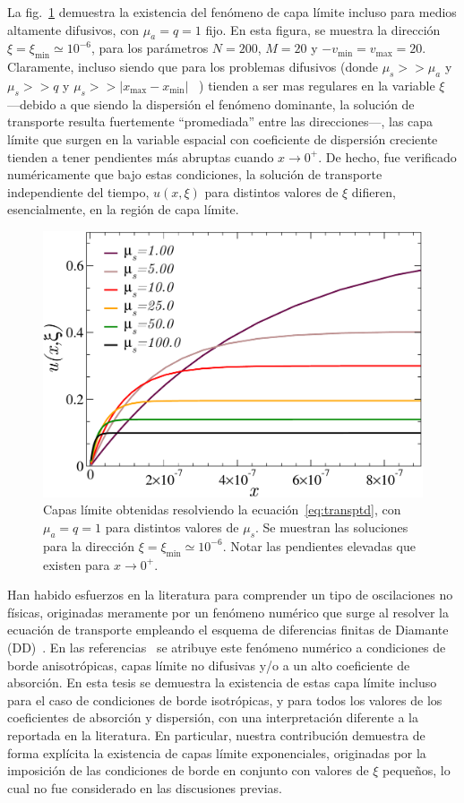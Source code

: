 La fig.~\ref{fig:blayers} demuestra la existencia del fenómeno 
de capa límite incluso para medios altamente difusivos, con 
$\mu_a=q=1$ fijo. En esta figura, se muestra la dirección 
$\xi=\xi_{\text{min}}\simeq 10^{-6}$, para los parámetros 
$N=200$, $M=20$ y $-v_{\text{min}}=v_{\text{max}}=20$. 
Claramente, incluso siendo que para los problemas difusivos 
(donde $\mu_s>>\mu_a$ y $\mu_s>>q$ y $\mu_s>>|x_{\text{max}}-x_{\text{min}}|$~ 
\cite{Larsen1987}) tienden a ser mas regulares en la variable $\xi$ 
---debido a que siendo la dispersión el fenómeno dominante, 
la solución de transporte resulta fuertemente ``promediada'' entre las direcciones---, 
las capa límite que surgen en la variable espacial con coeficiente 
de dispersión creciente tienden a tener pendientes más abruptas 
cuando $x\to 0^+$. De hecho, fue verificado numéricamente que bajo estas condiciones, 
la solución de transporte independiente del tiempo, $u(x,\xi)$ 
para distintos valores de $\xi$ difieren, esencialmente, en la región 
de capa límite.
\begin{figure}[h!]
\centering
  \includegraphics[width=0.5\linewidth]{figuras/blayers.pdf}
  \caption{Capas límite obtenidas resolviendo la ecuación~\eqref{eq:transptd}, 
  con $\mu_a=q=1$ para distintos valores de $\mu_s$. 
  Se muestran las soluciones para la dirección $\xi=\xi_{\text{min}} \simeq 10^{-6}$. 
  Notar las pendientes elevadas que existen para $x\to 0^+$.}
 \label{fig:blayers}
\end{figure}
Han habido esfuerzos en la literatura para comprender un tipo 
de oscilaciones no físicas, originadas 
meramente por un fenómeno numérico que 
surge al resolver la ecuación de transporte 
empleando el esquema de diferencias finitas de Diamante (DD)~\cite{Larsen1987,Petrovic1996,Bal2001}.
En las referencias~\cite{Larsen1987,Petrovic1996} se atribuye 
este fenómeno numérico a condiciones de borde anisotrópicas, capas límite no difusivas y/o 
a un alto coeficiente de absorción. En esta tesis 
se demuestra la existencia de estas capa límite incluso para el 
caso de condiciones de borde isotrópicas, y para todos los valores 
de los coeficientes de absorción y dispersión, con una interpretación 
diferente a la reportada en la literatura. En particular, 
nuestra contribución demuestra de forma explícita la existencia 
de capas límite exponenciales, originadas por la imposición 
de las condiciones de borde en conjunto con valores de  $\xi$ 
pequeños, lo cual no fue considerado en las discusiones previas.

